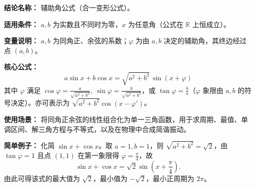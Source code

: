 \textbf{结论名称：} 辅助角公式（合一变形公式）。

\textbf{适用条件：} \(a,b\) 为实数且不同时为零，\(x\) 为任意角（公式在 \(\mathbb{R}\) 上恒成立）。

\textbf{变量说明：} \(a,b\) 为同角正、余弦的系数；\(\varphi\) 为由 \(a,b\) 决定的辅助角，其终边经过点 \((a,b)\)。

\textbf{核心公式：}
\[
\boxed{a\sin x + b\cos x = \sqrt{a^{2}+b^{2}}\,\sin(x+\varphi)}
\]
其中 \(\varphi\) 满足 \(\displaystyle\cos\varphi = \frac{a}{\sqrt{a^{2}+b^{2}}},\ \sin\varphi = \frac{b}{\sqrt{a^{2}+b^{2}}}\)，或 \(\displaystyle\tan\varphi = \frac{b}{a}\)（\(\varphi\) 象限由 \(a,b\) 的符号决定）。亦可表示为 \(\sqrt{a^{2}+b^{2}}\cos(x-\varphi')\)。

\textbf{使用场景：} 将同角正余弦的线性组合化为单一三角函数，用于求周期、最值、单调区间、解三角方程与不等式，以及在物理中合成简谐振动。

\textbf{简单例子：} 化简 \(\sin x + \cos x\)。取 \(a=1,b=1\)，则 \(\sqrt{a^{2}+b^{2}}=\sqrt{2}\)，由 \(\tan\varphi=1\) 且点 \((1,1)\) 在第一象限得 \(\varphi=\frac{\pi}{4}\)，故
\[
\sin x + \cos x = \sqrt{2}\sin\!\left(x+\frac{\pi}{4}\right).
\]
由此可得该式的最大值为 \(\sqrt{2}\)，最小值为 \(-\sqrt{2}\)，最小正周期为 \(2\pi\)。